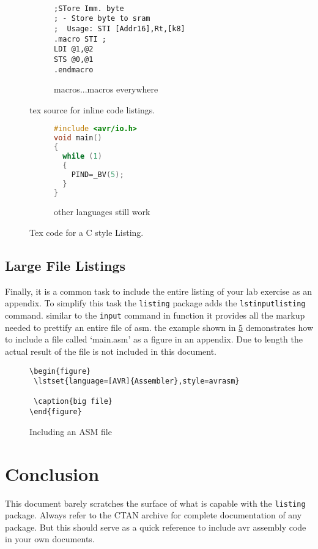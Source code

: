 \documentclass[titlepage]{article}
\begin{document}
\begin{figure}
\label{fig:inlineExample}
\begin{LTXexample}[style=ListingSample]
\begin{figure}
\label{fig:macros}
\begin{lstlisting}[frame=none]

;STore Imm. byte 
; - Store byte to sram
;  Usage: STI [Addr16],Rt,[k8]
.macro STI ;
LDI @1,@2
STS @0,@1
.endmacro
\end{lstlisting}
\caption{macros...macros everywhere}
\end{figure}
\end{LTXexample}
\caption{tex source for inline code listings.}
\end{figure}



\begin{figure}
	\label{fig:ClistingSOurce}
\begin{LTXexample}[style=ListingSample]
 \begin{figure}
 \label{fig:CListingg}
 \begin{lstlisting}[language=c,
            style=avrasm,frame=single]
#include <avr/io.h>
void main()
{
  while (1)
  {
    PIND=_BV(5);
  }	
}
 \end{lstlisting}
 \caption{other languages still work}
\end{figure}
\end{LTXexample}

\caption {Tex code for a C style Listing.}
\end{figure}


\subsection{Large File Listings}

Finally, it is a common task to include the entire listing of your lab exercise as an appendix. To simplify this task the \texttt{listing} package adds the \texttt{lstinputlisting} command. similar to the \texttt{input} command in function it provides all the markup needed to prettify an entire file of asm. the example shown in \cref{fig:includeASMfile} demonstrates how to include a file called `main.asm' as a figure in an appendix. Due to length the actual result of the file is not included in this document.

\begin{figure}
	\label{fig:includeASMfile}
\begin{lstlisting}[language=Tex,style=ListingSample]
\begin{figure}
 \lstset{language=[AVR]{Assembler},style=avrasm} 
 
 \caption{big file}
\end{figure}
\end{lstlisting}
\caption {Including an ASM file}
\end{figure}

\section{Conclusion}
This document barely scratches the surface of what is capable with the \texttt{listing} package. Always refer to the CTAN archive for complete documentation of any package. But this should serve as a quick reference to include avr assembly code in your own documents.
\end{document}
